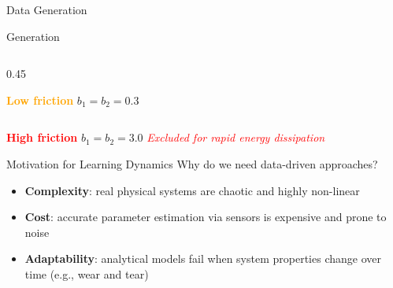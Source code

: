 \begin{frame}{Data Generation}
\begin{block}{Generation}
\begin{itemize}
\begin{columns}[T]
                \begin{column}{0.45\textwidth}
                   \item[\textcolor{orange}{$\bullet$}] \textcolor{orange}{\textbf{Low friction}} $b_1 = b_2 = 0.3$
                \end{column}
            \end{columns}
            
            \vspace{1em} %
            \centering
            \begin{minipage}{0.80\textwidth} 
                \item[\textcolor{red}{$\bullet$}] \textcolor{red}{\textbf{High friction}} $b_1 = b_2 = 3.0$ \quad \small \textit{\textcolor{red}{Excluded for rapid energy dissipation}}
            \end{minipage}
            
        \end{itemize}
    \end{block}

\end{frame}



\begin{frame}{Motivation for Learning Dynamics}
    Why do we need data-driven approaches?
    
    \vspace{1em}

    \begin{itemize}
        \setlength\itemsep{1.5em} %
        \item \textbf{Complexity}: real physical systems are chaotic and highly non-linear
        \item \textbf{Cost}: accurate parameter estimation via sensors is expensive and prone to noise
        \item \textbf{Adaptability}: analytical models fail when system properties change over time (e.g., wear and tear)
    \end{itemize}
    
    \vfill %
\end{frame}

  

